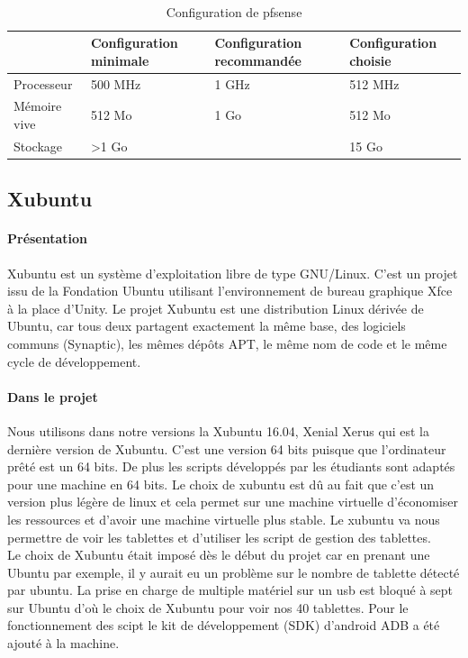 \documentclass[a4paper,12pt]{extarticle}
\begin{document}
\paragraph{}
\begin{table}[!h]
\begin{tabular}{|p{3cm}|p{3cm}|p{3cm}|p{3cm}|}
\hline
 & Configuration minimale & Configuration recommandée & Configuration choisie\\
\hline 
Processeur & 500 MHz & 1 GHz & 512 MHz\\
\hline
Mémoire vive & 512 Mo & 1 Go & 512 Mo \\
\hline
Stockage & >1 Go & & 15 Go \\
\hline
\end{tabular}
\caption{Configuration de pfsense}
\end{table}


\subsection{Xubuntu}
\paragraph{Présentation\\}

Xubuntu est un système d'exploitation libre de type GNU/Linux. C'est un projet issu de la Fondation Ubuntu utilisant l'environnement de bureau graphique Xfce à la place d'Unity. Le projet Xubuntu est une distribution Linux dérivée de Ubuntu, car tous deux partagent exactement la même base, des logiciels communs (Synaptic), les mêmes dépôts APT, le même nom de code et le même cycle de développement.


\paragraph{Dans le projet\\}

Nous utilisons dans notre versions la Xubuntu 16.04, Xenial Xerus qui est la dernière version de Xubuntu. C’est une version 64 bits puisque que l’ordinateur prêté est un 64 bits. De plus les scripts développés par les étudiants sont adaptés pour une machine en 64 bits.
Le choix de xubuntu est dû au fait que c’est un version plus légère de linux et cela permet sur une machine virtuelle d’économiser les ressources et d’avoir une machine virtuelle plus stable.
Le xubuntu va nous permettre de voir les tablettes et d’utiliser les script de gestion des tablettes. \\
Le choix de Xubuntu était imposé dès le début du projet car en prenant une Ubuntu par exemple, il y aurait eu  un problème sur le nombre de tablette détecté par ubuntu. La prise en charge de multiple matériel sur un usb est bloqué à sept sur Ubuntu d'où le choix de Xubuntu pour voir nos 40 tablettes. 
Pour le fonctionnement des scipt le kit de développement (SDK) d’android ADB a été ajouté à la machine.
\end{document}
